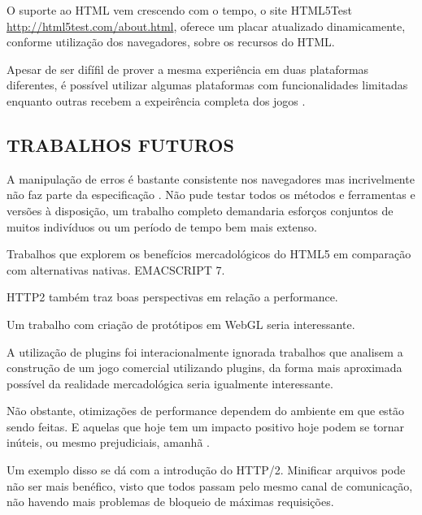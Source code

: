 \begin{draft}
O suporte ao HTML vem crescendo com o tempo, o site HTML5Test
\url{http://html5test.com/about.html}, oferece um placar atualizado
dinamicamente, conforme utilização dos navegadores, sobre os recursos
do HTML.

Apesar de ser difífil de prover a mesma experiência em duas plataformas diferentes, é possível utilizar algumas plataformas com funcionalidades limitadas enquanto outras recebem a expeirência completa dos jogos \autocite[pp. 1]{currentStateCrossPlatform}.

\subsection{TRABALHOS FUTUROS}
A manipulação de erros é bastante consistente nos navegadores mas 
incrivelmente não faz parte da especificação \autocite{howBrowsersWork}.
Não pude testar todos os métodos e ferramentas e versões à
disposição, um trabalho completo demandaria esforços conjuntos de
muitos indivíduos ou um período de tempo bem mais extenso. 

Trabalhos que explorem os benefícios mercadológicos do HTML5 em comparação com alternativas nativas.
EMACSCRIPT 7.

HTTP2 também traz boas perspectivas em relação a performance.

Um trabalho com criação de protótipos em WebGL seria interessante.

A utilização de plugins foi interacionalmente ignorada trabalhos
que analisem a construção de um jogo comercial utilizando plugins,
da forma mais aproximada possível da realidade mercadológica seria
igualmente interessante.

Não obstante, otimizações de performance dependem do ambiente em
que estão sendo feitas. E aquelas que hoje tem um impacto positivo
hoje podem se tornar inúteis, ou mesmo prejudiciais, amanhã
\autocite[pp.131]{html5mostwanted}.

Um exemplo disso se dá com a introdução do HTTP/2. Minificar arquivos
pode não ser mais benéfico, visto que todos passam pelo mesmo canal
de comunicação, não havendo mais problemas de bloqueio de máximas
requisições.

\end{draft}
